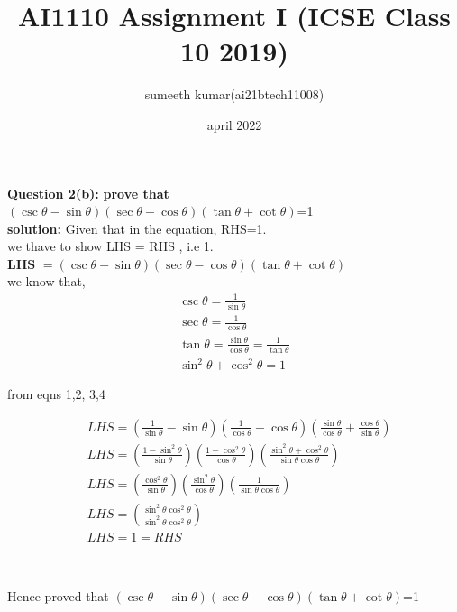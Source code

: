 \documentclass[journel,11pt,two column]{IEEEtran}
\title{AI1110 Assignment I (ICSE Class 10 2019)}
\author{sumeeth kumar(ai21btech11008)}
\date{april 2022}
\begin{document}
\maketitle
\textbf{Question 2(b):}
 \textbf{ prove that}\\
  ${(\csc \theta - \sin \theta)(\sec \theta -\cos \theta)(\tan \theta +\cot \theta)}$=1 \\  
 \textbf{solution:}   Given that in the equation, RHS=1.\\ 
 we thave to show LHS = RHS , i.e 1.\\  
 \textbf{LHS} $=(\csc \theta - \sin \theta)(\sec \theta -\cos \theta)(\tan \theta +\cot \theta)$\\
 we know that,
 \begin{align}
  \csc\theta = \frac{1}{
  \sin \theta}\\[8pt]
  \sec\theta = \frac{1}{\cos \theta}\\[8pt]
  \tan\theta = \frac{\sin\theta}{\cos\theta}=\frac{1}{\tan \theta}\\[8pt]
  \sin^2\theta+\cos^2\theta=1
 \end{align} 
 
 \vspace{0.1cm}
 
 \begin{center}
  from eqns 1,2, 3,4\\[8pt]
 \end{center}
\begin{align*}
 &{LHS=\left(\frac{1}{\sin\theta}-\sin\theta    \right)\left(\frac{1}{\cos\theta}-\cos\theta \right)\left(\frac{\sin\theta}{\cos\theta}+\frac{\cos\theta}{\sin\theta}\right)}\\[8pt]  
 &{ LHS=\left(\frac{1-\sin^2\theta}{\sin\theta}\right)\left(\frac{1-\cos^2\theta}{\cos\theta}\right)\left(\frac{\sin^2\theta+\cos^2\theta}{\sin\theta \cos\theta}\right)}\\[8pt]
 &{LHS=\left(\frac{\cos^2\theta}{\sin\theta}\right)\left(\frac{\sin^2\theta}{\cos\theta}\right)\left(\frac{1}{\sin\theta \cos\theta}\right)}\\[8pt]
 &{LHS=\left(\frac{\sin^2\theta \cos^2\theta}{\sin^2\theta \cos^2\theta}\right)}\\[8pt]
 &{LHS=1=RHS}
\end{align*}
\begin{center}
\\ 
[8pt]
\end{center}

 Hence proved that ${(\csc \theta - \sin \theta)(\sec \theta -\cos \theta)(\tan \theta +\cot \theta)}$=1 \\  
 
\end{document}
